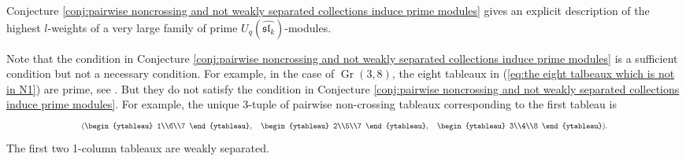 \documentclass[12pt, reqno]{amsart}
\theoremstyle{plain}
\theoremstyle{definition}
\numberwithin{equation}{section}
\DeclareMathOperator{\Gr}{Gr}
\newcommand\scalemath[2]{\scalebox{#1}{\mbox{\ensuremath{\displaystyle #2}}}}
\begin{document}
Conjecture \ref{conj:pairwise noncrossing and not weakly separated collections induce prime modules} gives an explicit description of the highest $l$-weights of a very large family of prime $U_q(\widehat{\mathfrak{sl}_k})$-modules.

Note that the condition in Conjecture \ref{conj:pairwise noncrossing and not weakly separated collections induce prime modules} is a sufficient condition but not a necessary condition. For example, in the case of $\Gr(3,8)$, the eight tableaux in (\ref{eq:the eight talbeaux which is not in N1}) are prime, see \cite{CDHHHL, RSV21}. But they do not satisfy the condition in Conjecture \ref{conj:pairwise noncrossing and not weakly separated collections induce prime modules}. For example, the unique $3$-tuple of pairwise non-crossing tableaux corresponding to the first tableau is
\begin{align*}
\scalemath{0.7}{ (\begin{ytableau}
 1\\6\\7
\end{ytableau}, \quad \begin{ytableau}
 2\\5\\7
\end{ytableau}, \quad \begin{ytableau}
 3\\4\\8
\end{ytableau}).  }
\end{align*}
The first two 1-column tableaux are weakly separated. 
\end{document}

